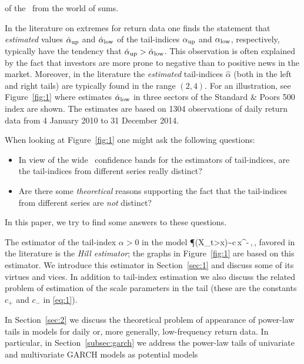 of the \clt\ from the world of sums.
\par
In the literature on extremes for return data one finds the 
statement that {\em estimated} values $\hat \alpha_{\rm up}$ and $\hat \alpha_{\rm low}$ 
of the tail-indices $\alpha_{\rm up}$ and $\alpha_{\rm low}$,
respectively, typically have the tendency that $\hat \alpha_{\rm
  up}>\hat \alpha_{\rm low}$. 
This observation is often explained by the fact that investors are
more prone to negative than to positive news in the market. 
Moreover, in the literature the {\em estimated} tail-indices $\hat \alpha$ (both in the left and right tails) 
are typically found in the range $(2,4)$. For an illustration, see
Figure~\ref{fig:1} where estimates $\hat \alpha_{\rm low}$ 
in three sectors of the Standard \& Poors 500 index  are shown. The
estimates are based on 1304 observations of daily return 
data from 4 January 2010 to 31 December 2014.
\par
When looking at Figure~\ref{fig:1} one might ask the following questions:
\begin{itemize}
\item
In view of the wide \asy\ confidence bands for the estimators of tail-indices, 
are the tail-indices from different series really distinct?
\item
Are there some {\em theoretical} reasons supporting the fact that the tail-indices from different series are {\em not} 
distinct?
\end{itemize}
In this paper, we try to find some answers to these questions. 
\par
The estimator of the tail-index $\alpha>0$  in the model
\beao
\P(X_t>x)\sim c\,x^{-\alpha}\,,\qquad \xto\,,
\eeao
favored in the literature  is the {\em Hill estimator}; the graphs in 
Figure~\ref{fig:1} are based on this estimator. We introduce this estimator in Section~\ref{sec:1} and discuss 
some of its virtues and vices. In addition to tail-index estimation we also discuss the related problem of
estimation of the scale parameters in the tail (these are the constants $c_+$ and $c_-$ in \eqref{eq:1}). 
\par
In Section~\ref{sec:2} we discuss the theoretical problem of appearance of power-law tails in models 
for daily or, more generally, low-frequency
return data. In particular, in Section~\ref{subsec:garch} we address the power-law tails of univariate and multivariate GARCH models as potential models
